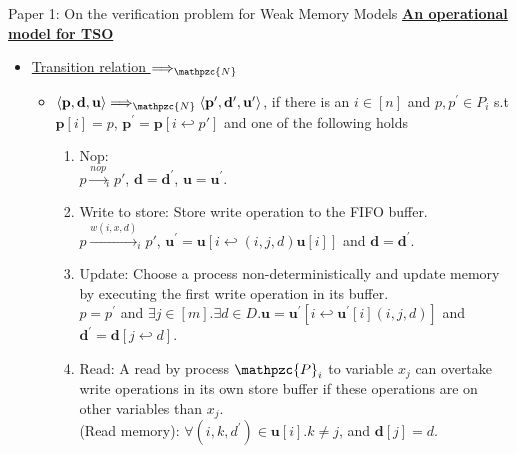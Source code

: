 \documentclass[9pt]{beamer}
\begin{document}
\begin{frame}{Paper 1: On the verification problem for Weak Memory Models}
\underline{\textbf{An operational model for TSO}}\\
\begin{itemize}
\item \underline{Transition relation $\Longrightarrow_\mathpzc{N}$}
\begin{itemize}
\item $\langle \mathbf{p}, \mathbf{d}, \mathbf{u}\rangle \Longrightarrow_\mathpzc{N} \langle \mathbf{p^{\prime}}, \mathbf{d^{\prime}}, \mathbf{u^{\prime}} \rangle$,
      if there is an $i \in [n]$ and $p, p^{\prime} \in P_i$ s.t $\mathbf{p}[i] = p$,
			$\mathbf{p}^{\prime} = \mathbf{p}[i \hookleftarrow p{\prime}]$ and one of the following holds
			\begin{enumerate}
			\item Nop:\\
			\vspace{2mm}
				    $p \overset{nop}{\longrightarrow}_i p{\prime}$, $\mathbf{d} = \mathbf{d^{\prime}}$, $\mathbf{u} = \mathbf{u^{\prime}}$.
			\vspace{2mm}
			\item Write to store: Store write operation to the FIFO buffer.\\
			\vspace{2mm}
						$p \overset{w(i,x,d)}{\longrightarrow}_i p{\prime}$, $\mathbf{u^{\prime}} = \mathbf{u}[i \hookleftarrow (i,j,d)\mathbf{u}[i]]$
						and $\mathbf{d} = \mathbf{d^{\prime}}$.
			\vspace{2mm}
			\item Update: Choose a process non-deterministically and update memory by executing the first write operation
										in its buffer.\\
			\vspace{2mm}
						$p = p^{\prime}$ and $\exists j \in [m].\exists d \in D.\mathbf{u} = \mathbf{u}^{\prime}[i \hookleftarrow
						\mathbf{u}^{\prime}[i](i,j,d)]$ and $\mathbf{d}^{\prime} = \mathbf{d}[j \hookleftarrow d]$.
			\vspace{2mm}
			\item Read: A read by process $\mathpzc{P}_i$ to variable $x_j$ can overtake write operations in its own store
						buffer if these operations are on other variables than $x_j$.\\
			\vspace{2mm}
						(Read memory): $\forall (i,k,d^{\prime}) \in \mathbf{u}[i].k \neq j$, and $\mathbf{d}[j] = d$.\\

\end{enumerate}
\end{itemize}
\end{itemize}
\end{frame}
\end{document}
